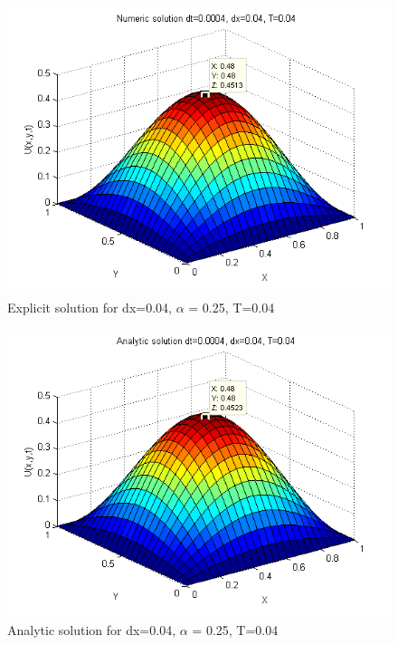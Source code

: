 \documentclass[a4paper,10pt]{article}
\begin{document}
{\begin{figure}
\end{figure}

\begin{figure}
  \begin{center}
    \includegraphics[scale=0.5]{num_dt00004_dx004_T004}
    \caption{Explicit solution for dx=0.04, $\alpha$ = 0.25, T=0.04}
    \label{fig:Num_dx0.04}
  \end{center}

\end{figure}
\begin{figure}
  \begin{center}
    \includegraphics[scale=0.5]{ana_dt00004_dx004_T004}
    \caption{Analytic solution for dx=0.04, $\alpha$ = 0.25, T=0.04}
    \label{fig:Ana_dx0.04}
  \end{center}


\end{figure}}
\end{document}
